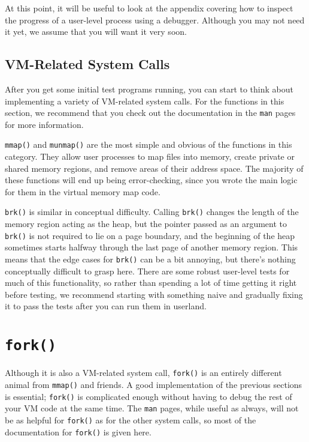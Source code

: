 At this point, it will be useful to look at the  appendix covering how to inspect the progress of a user-level process using a debugger. Although you may not need it yet, we assume that you will want it very soon.

\subsection{VM-Related System Calls}

After you get some initial test programs running, you can start to think about implementing a variety of VM-related system calls. For the functions in this section, we recommend that you check out the documentation in the \texttt{man} pages for more information.

\texttt{mmap()} and \texttt{munmap()} are the most simple and obvious of the functions in this category. They allow user processes to map files into memory, create private or shared memory regions, and remove areas of their address space. The majority of these functions will end up being error-checking, since you wrote the main logic for them in the virtual memory map code.

\texttt{brk()} is similar in conceptual difficulty. Calling \texttt{brk()} changes the length of the memory region acting as the heap, but the pointer passed as an argument to \texttt{brk()} is not required to lie on a page boundary, and the beginning of the heap sometimes starts halfway through the last page of another memory region. This means that the edge cases for \texttt{brk()} can be a bit annoying, but there's nothing conceptually difficult to grasp here. There are some robust user-level tests for much of this functionality, so rather than spending a lot of time getting it right before testing, we recommend starting with something naive and gradually fixing it to pass the tests after you can run them in userland.

\section{\texttt{fork()}}

Although it is also a VM-related system call, \texttt{fork()} is an entirely different animal from \texttt{mmap()} and friends. A good implementation of the previous sections is essential; \texttt{fork()} is complicated enough without having to debug the rest of your VM code at the same time. The \texttt{man} pages, while useful as always, will not be as helpful for \texttt{fork()} as for the other system calls, so most of the documentation for \texttt{fork()} is given here.

